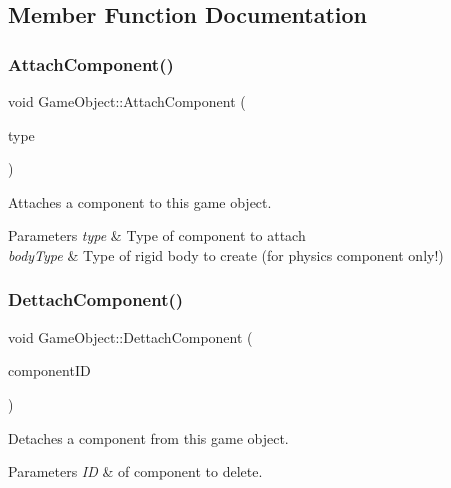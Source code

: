 \subsection{Member Function Documentation}
\mbox{\label{class_game_object_a1e8c34679f8e8decbd9628a890f47c7f}} 
\subsubsection{\texorpdfstring{Attach\+Component()}{AttachComponent()}}
{\footnotesize\ttfamily void Game\+Object\+::\+Attach\+Component (\begin{DoxyParamCaption}\item[{const \mbox{\hyperlink{class_component_pool_a7a88ce8bc60d1936539c2b9757b7e9ff}{Component\+Pool\+::\+Type}} \&}]{type }\end{DoxyParamCaption})}



Attaches a component to this game object. 


\begin{DoxyParams}{Parameters}
{\em type} & Type of component to attach \\
\hline
{\em body\+Type} & Type of rigid body to create (for physics component only!) \\
\hline
\end{DoxyParams}
\mbox{\label{class_game_object_a4d100b6ecc6476f52c72f0889e6c06d4}} 
\subsubsection{\texorpdfstring{Dettach\+Component()}{DettachComponent()}}
{\footnotesize\ttfamily void Game\+Object\+::\+Dettach\+Component (\begin{DoxyParamCaption}\item[{const unsigned int}]{component\+ID }\end{DoxyParamCaption})}



Detaches a component from this game object. 


\begin{DoxyParams}{Parameters}
{\em ID} & of component to delete. \\
\hline
\end{DoxyParams}
\mbox{\label{class_game_object_ae232f791564f4bf504e0ede697be7f0d}} 

